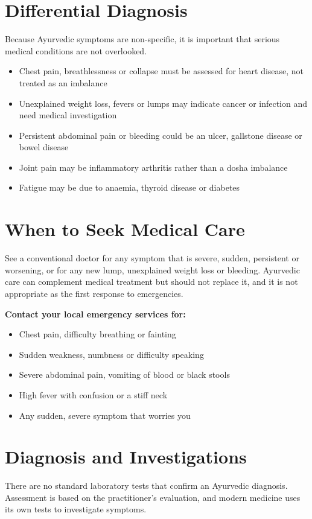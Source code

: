 \section*{Differential Diagnosis}
Because Ayurvedic symptoms are non-specific, it is important that serious medical conditions are not overlooked.

\begin{itemize}
    \item Chest pain, breathlessness or collapse must be assessed for heart disease, not treated as an imbalance
    \item Unexplained weight loss, fevers or lumps may indicate cancer or infection and need medical investigation
    \item Persistent abdominal pain or bleeding could be an ulcer, gallstone disease or bowel disease
    \item Joint pain may be inflammatory arthritis rather than a dosha imbalance
    \item Fatigue may be due to anaemia, thyroid disease or diabetes
\end{itemize}

\section*{When to Seek Medical Care}
See a conventional doctor for any symptom that is severe, sudden, persistent or worsening, or for any new lump, unexplained weight loss or bleeding. Ayurvedic care can complement medical treatment but should not replace it, and it is not appropriate as the first response to emergencies.

\textbf{Contact your local emergency services for:}
\begin{itemize}
    \item Chest pain, difficulty breathing or fainting
    \item Sudden weakness, numbness or difficulty speaking
    \item Severe abdominal pain, vomiting of blood or black stools
    \item High fever with confusion or a stiff neck
    \item Any sudden, severe symptom that worries you
\end{itemize}

\section*{Diagnosis and Investigations}
There are no standard laboratory tests that confirm an Ayurvedic diagnosis. Assessment is based on the practitioner's evaluation, and modern medicine uses its own tests to investigate symptoms.

